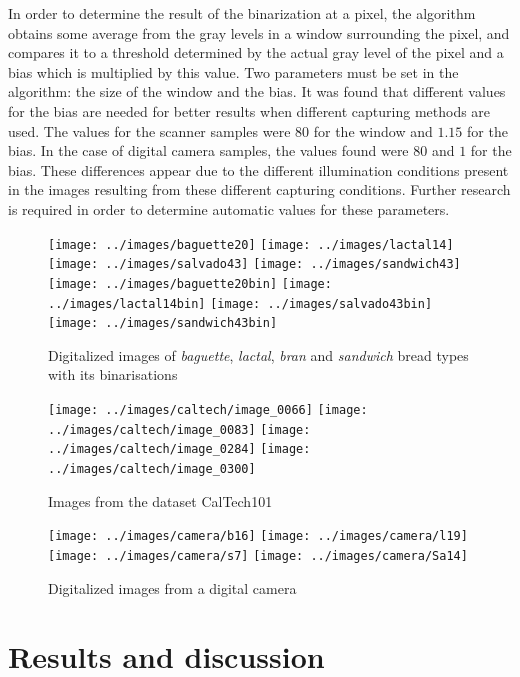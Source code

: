 In order to determine the result of the binarization at a pixel, the algorithm obtains some average from the gray levels in a window surrounding the pixel, and compares it to a threshold determined by the actual gray level of the pixel and a bias which is multiplied by this value. Two parameters must be set in the algorithm: the size of the window and the bias. It was found that different values for the bias are needed for better results when different capturing methods are used. The values for the scanner samples were $80$ for the window and $1.15$ for the bias. In the case of digital camera samples, the values found were $80$ and $1$ for the bias. These differences appear due to the different illumination conditions present in the images resulting from these different capturing conditions. Further research is required in order to determine automatic values for these parameters.

\begin{figure}[htb]
\centering
\texttt{[image: ../images/baguette20]}
\texttt{[image: ../images/lactal14]}
\texttt{[image: ../images/salvado43]}
\texttt{[image: ../images/sandwich43]}
\texttt{[image: ../images/baguette20bin]}
\texttt{[image: ../images/lactal14bin]}
\texttt{[image: ../images/salvado43bin]}
\texttt{[image: ../images/sandwich43bin]}
\caption{Digitalized images of {\em baguette}, {\em lactal}, {\em bran} and {\em sandwich} bread types with its binarisations}
\label{fig:bread}
\end{figure}

\begin{figure}[htb]
\centering
\texttt{[image: ../images/caltech/image\_0066]}
\texttt{[image: ../images/caltech/image\_0083]}
\texttt{[image: ../images/caltech/image\_0284]}
\texttt{[image: ../images/caltech/image\_0300]}
\caption{Images from the dataset CalTech101}
\label{fig:nonbread}
\end{figure}

\begin{figure}[htb]
\centering
\texttt{[image: ../images/camera/b16]}
\texttt{[image: ../images/camera/l19]}
\texttt{[image: ../images/camera/s7]}
\texttt{[image: ../images/camera/Sa14]}
\caption{Digitalized images from a digital camera}
\label{fig:camera}
\end{figure}

\section{Results and discussion}
\label{sec:9}

